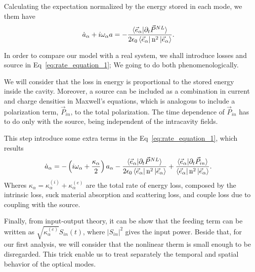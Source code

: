 Calculating the expectation %
normalized by the energy stored in each mode, we them have 
\begin{equation}
    \dot{a}_\alpha + i \omega_\alpha a = -\frac{\braket{\vec{e}_\alpha|\partial_t\vec{P}^{NL}}}{2\epsilon_0\bra{\vec{e}_\alpha}\text{n}^2\ket{\vec{e}_\alpha}}.
    \label{eq:rate_equation_1}
\end{equation}

In order to compare our model with a real system, we shall introduce losses and source in Eq~\ref{eq:rate_equation_1}; We going to do both phenomenologically.

We will consider that the loss in energy is proportional to the stored energy inside the cavity. Moreover, a source can be included as a combination in current and charge densities in Maxwell's equations, which is analogous to include a polarization term, $\vec{P}_{in}$, to the total polarization. The time dependence of $\vec{P}_{in}$ has to do only with the source, being independent of the intracavity fields.

This step introduce some extra terms in the Eq~\ref{eq:rate_equation_1}, which results
\begin{equation}
    \dot{a}_\alpha = -\left(i\omega_\alpha +\frac{\kappa_\alpha}{2}\right)a_\alpha -\frac{\braket{\vec{e}_\alpha|\partial_t\vec{P}^{NL}}}{2\epsilon_0\bra{\vec{e}_\alpha}\text{n}^2\ket{\vec{e}_\alpha}}+\frac{\braket{\vec{e}_\alpha|\partial_t\vec{P}_{in}}}{\bra{\vec{e}_\alpha}\text{n}^2\ket{\vec{e}_\alpha}}.
\end{equation}
Wheres $\kappa_\alpha = \kappa^{(i)}_\alpha+\kappa^{(e)}_\alpha$ are the total rate of energy loss, composed by the intrinsic loss, suck material absorption and scattering loss, and couple loss due to coupling with the source. 

Finally, from input-output theory, it can be show that the feeding term can be written as $\sqrt{\kappa^{(e)}_\alpha}S_{in}(t)$, where $|S_{in}|^2$ gives the input power. Beside that, for our first analysis, we will consider that the nonlinear therm is small enough to be disregarded. This trick enable us to treat separately the temporal and spatial behavior of the optical modes. 

